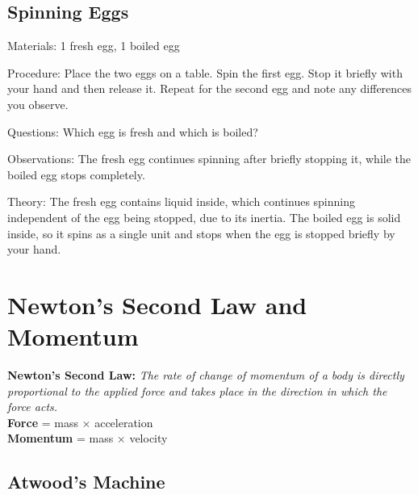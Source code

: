 \begin{multicols}{2}
\subsection{Spinning Eggs}


\begin{description*}
\item[Materials:]{1 fresh egg, 1 boiled egg}
\item[Procedure:]{Place the two eggs on a table. Spin the first egg. Stop it briefly with your hand and then release it. Repeat for the second egg and note any differences you observe.}
\item[Questions:]{Which egg is fresh and which is boiled?}
\item[Observations:]{The fresh egg continues spinning after briefly stopping it, while the boiled egg stops completely.}
\item[Theory:]{The fresh egg contains liquid inside, which continues spinning independent of the egg being stopped, due to its inertia. The boiled egg is solid inside, so it spins as a single unit and stops when the egg is stopped briefly by your hand.}
\end{description*}


\section*{Newton's Second Law and Momentum}
\textbf{Newton's Second Law:} \emph{The rate of change of momentum of a body is directly proportional to the applied force and takes place in the direction in which the force acts.}\\
\textbf{Force} = mass $\times$ acceleration\\
\textbf{Momentum} = mass $\times$ velocity

\subsection{Atwood's Machine}


\end{multicols}
